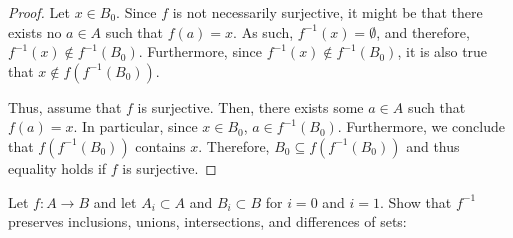 \documentclass[12pt]{article}
\begin{document}
\begin{enumerate}[label=(\alph*)]
\begin{proof}
		Let $x \in B_0$. Since $f$ is not necessarily surjective, it might be that 
		there exists no $a \in A$ such that $f(a) = x$. As such, $f^{-1}(x) = \emptyset$,
		and therefore, $f^{-1}(x) \notin f^{-1}(B_0)$. Furthermore, since 
		$f^{-1}(x) \notin f^{-1}(B_0)$, it is also true that $x \notin f(f^{-1}(B_0))$.
		
		Thus, assume that $f$ is surjective. Then, there exists some $a \in A$ such that
		$f(a) = x$. In particular, since $x \in B_0$, $a \in f^{-1}(B_0)$. Furthermore,
		we conclude that $f(f^{-1}(B_0))$ contains $x$. Therefore, 
		$B_0 \subseteq f(f^{-1}(B_0))$ and thus equality holds if $f$ is surjective.
	\end{proof}
\end{enumerate}

\pagebreak
{} Let $f: A \to B$ and let $A_i \subset A$ and $B_i \subset B$ for $i = 0$
and $i = 1$. Show that $f^{-1}$ preserves inclusions, unions, intersections, and differences
of sets:
\end{document}
